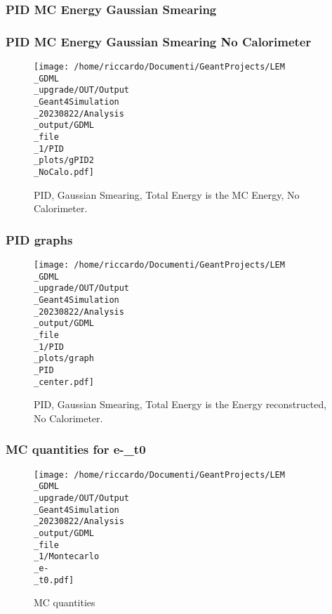 \documentclass[8pt]{beamer}
\begin{document}
            \begin{frame}
                \frametitle{PID MC Energy Gaussian Smearing}
            
            \end{frame}
            
            \begin{frame}
                \frametitle{PID MC Energy Gaussian Smearing No Calorimeter}
            
        \begin{figure}[h]
            \centering
            \texttt{[image: /home/riccardo/Documenti/GeantProjects/LEM\\\_GDML\\\_upgrade/OUT/Output\\\_Geant4Simulation\\\_20230822/Analysis\\\_output/GDML\\\_file\\\_1/PID\\\_plots/gPID2\\\_NoCalo.pdf]}
            \caption{PID, Gaussian Smearing, Total Energy is the MC Energy, No Calorimeter.}
        \end{figure}
        
            \end{frame}
            
            \begin{frame}
                \frametitle{PID graphs}
            
        \begin{figure}[h]
            \centering
            \texttt{[image: /home/riccardo/Documenti/GeantProjects/LEM\\\_GDML\\\_upgrade/OUT/Output\\\_Geant4Simulation\\\_20230822/Analysis\\\_output/GDML\\\_file\\\_1/PID\\\_plots/graph\\\_PID\\\_center.pdf]}
            \caption{PID, Gaussian Smearing, Total Energy is the Energy reconstructed, No Calorimeter.}
        \end{figure}
        
            \end{frame}
            
            \begin{frame}
                \frametitle{MC quantities for e-\_t0}
            
        \begin{figure}[h]
            \centering
            \texttt{[image: /home/riccardo/Documenti/GeantProjects/LEM\\\_GDML\\\_upgrade/OUT/Output\\\_Geant4Simulation\\\_20230822/Analysis\\\_output/GDML\\\_file\\\_1/Montecarlo\\\_e-\\\_t0.pdf]}
            \caption{MC quantities}
        \end{figure}
        
            \end{frame}
            
\end{document}
